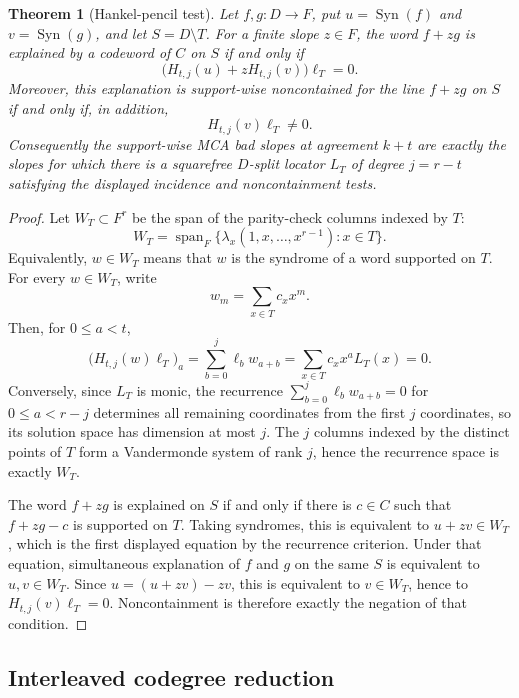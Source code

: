 \documentclass[11pt]{article}
\newtheorem{theorem}{Theorem}
\begin{document}
\begin{theorem}[Hankel-pencil test]
\label{thm:syndrome-pencil}
Let \(f,g:D\to F\), put \(u=\operatorname{Syn}(f)\) and
\(v=\operatorname{Syn}(g)\), and let \(S=D\setminus T\).  For a finite slope
\(z\in F\), the word \(f+zg\) is explained by a codeword of \(C\) on \(S\) if
and only if
\[
  \bigl(H_{t,j}(u)+zH_{t,j}(v)\bigr)\boldsymbol\ell_T=0.
\]
Moreover, this explanation is support-wise noncontained for the line
\(f+zg\) on \(S\) if and only if, in addition,
\[
  H_{t,j}(v)\boldsymbol\ell_T\ne0.
\]
Consequently the support-wise MCA bad slopes at agreement \(k+t\) are exactly
the slopes for which there is a squarefree \(D\)-split locator \(L_T\) of
degree \(j=r-t\) satisfying the displayed incidence and noncontainment tests.
\end{theorem}

\begin{proof}
Let \(W_T\subset F^r\) be the span of the parity-check columns indexed by
\(T\):
\[
  W_T=\operatorname{span}_F\{\lambda_x(1,x,\ldots,x^{r-1}):x\in T\}.
\]
Equivalently, \(w\in W_T\) means that \(w\) is the syndrome of a word supported
on \(T\).  For every \(w\in W_T\), write
\[
  w_m=\sum_{x\in T}c_xx^m.
\]
Then, for \(0\le a<t\),
\[
  \bigl(H_{t,j}(w)\boldsymbol\ell_T\bigr)_a
  =\sum_{b=0}^j\ell_b w_{a+b}
  =\sum_{x\in T}c_xx^aL_T(x)=0.
\]
Conversely, since \(L_T\) is monic, the recurrence
\(\sum_{b=0}^j\ell_b w_{a+b}=0\) for \(0\le a<r-j\) determines all remaining
coordinates from the first \(j\) coordinates, so its solution space has
dimension at most \(j\).  The \(j\) columns indexed by the distinct points of
\(T\) form a Vandermonde system of rank \(j\), hence the recurrence space is
exactly \(W_T\).

The word \(f+zg\) is explained on \(S\) if and only if there is \(c\in C\) such
that \(f+zg-c\) is supported on \(T\).  Taking syndromes, this is equivalent to
\(u+zv\in W_T\), which is the first displayed equation by the recurrence
criterion.  Under that equation, simultaneous explanation of \(f\) and \(g\) on
the same \(S\) is equivalent to \(u,v\in W_T\).  Since
\(u=(u+zv)-zv\), this is equivalent to \(v\in W_T\), hence to
\(H_{t,j}(v)\boldsymbol\ell_T=0\).  Noncontainment is therefore exactly the
negation of that condition.
\end{proof}

\subsection{Interleaved codegree reduction}
\end{document}

